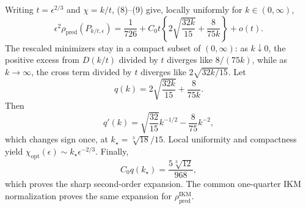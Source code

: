 Writing \(t=\epsilon^{2/3}\) and \(\chi=k/t\), (8)--(9) give, locally uniformly for \(k\in(0,\infty)\),
\[
 \epsilon^2\rho_{\mathrm{pred}}(P_{k/t,\epsilon})
 =\frac1{726}+C_0t\left\{2\sqrt{\frac{32k}{15}}+\frac8{75k}\right\}+o(t). \tag{10}
\]
The rescaled minimizers stay in a compact subset of \((0,\infty)\): as \(k\downarrow0\), the positive excess from \(D(k/t)\) divided by \(t\) diverges like \(8/(75k)\), while as \(k\to\infty\), the cross term divided by \(t\) diverges like \(2\sqrt{32k/15}\). Let
\[
 q(k)=2\sqrt{\frac{32k}{15}}+\frac8{75k}.
\]
Then
\[
 q'(k)=\sqrt{\frac{32}{15}}k^{-1/2}-\frac8{75}k^{-2},
\]
which changes sign once, at \(k_\star=\sqrt[3]{18}/15\). Local uniformity and compactness yield \(\chi_{\mathrm{opt}}(\epsilon)\sim k_\star\epsilon^{-2/3}\). Finally,
\[
 C_0q(k_\star)=\frac{5\sqrt[3]{12}}{968},
\]
which proves the sharp second-order expansion. The common one-quarter IKM normalization proves the same expansion for \(\rho_{\mathrm{pred}}^{\mathrm{IKM}}\).
